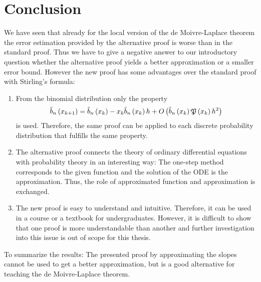 \chapter{Conclusion}

We have seen that already for the local version of the de Moivre-Laplace theorem the error estimation provided by the alternative proof is worse than in the standard proof. Thus we have to give a negative answer to our introductory question whether the alternative proof yields a better approximation or a smaller error bound. However the new proof has some advantages over the standard proof with Stirling's formula:

\begin{enumerate}
  \item From the binomial distribution only the property
    \begin{align}
      \bb{\x[k+1]} = \bb{\x[k]} - \x[k]\bb{\x[k]} h + \bigo{\bb{\x[k]} \pol{\x[k]} h^2}
    \end{align}
    is used. Therefore, the same proof can be applied to each discrete probability distribution that fulfills the same property.

  \item The alternative proof connects the theory of ordinary differential equations with probability theory in an interesting way: The one-step method corresponds to the given function and the solution of the ODE is the approximation. Thus, the role of approximated function and approximation is exchanged.

  \item The new proof is easy to understand and intuitive. Therefore, it can be used in a course or a textbook for undergraduates. However, it is difficult to show that one proof is more understandable than another \cite{tampis:understandability} and further investigation into this issue is out of scope for this thesis.
\end{enumerate}

To summarize the results: The presented proof by approximating the slopes cannot be used to get a better approximation, but is a good alternative for teaching the de Moivre-Laplace theorem.
